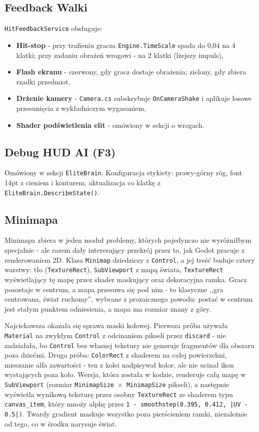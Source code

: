 \subsection{Feedback Walki}

\texttt{HitFeedbackService} obsługuje:
\begin{itemize}
    \item \textbf{Hit-stop} - przy trafieniu gracza \texttt{Engine.TimeScale} spada do 0{,}04 na 4 klatki; przy zadaniu obrażeń wrogowi - na 2 klatki (lżejszy impuls),
    \item \textbf{Flash ekranu} - czerwony, gdy gracz dostaje obrażenia; zielony, gdy zbiera rzadki przedmiot,
    \item \textbf{Drżenie kamery} - \texttt{Camera.cs} subskrybuje \texttt{OnCameraShake} i aplikuje losowe przesunięcia z wykładniczym wygasaniem,
    \item \textbf{Shader podświetlenia elit} - omówiony w sekcji o wrogach.
\end{itemize}

\subsection{Debug HUD AI (F3)}

Omówiony w sekcji \texttt{EliteBrain}. Konfiguracja etykiety: prawy-górny róg, font 14pt z cieniem i konturem, aktualizacja co klatkę z \texttt{EliteBrain.\allowbreak DescribeState()}.

\subsection{Minimapa}

Minimapa zbiera w jeden moduł problemy, których pojedynczo nie wyróżniłbym specjalnie - ale razem dały interesujący przekrój przez to, jak Godot pracuje z renderowaniem 2D. Klasa \texttt{Minimap} dziedziczy z \texttt{Control}, a jej treść buduje cztery warstwy: tło (\texttt{TextureRect}), \texttt{SubViewport} z mapą świata, \texttt{TextureRect} wyświetlający tę mapę przez shader maskujący oraz dekoracyjna ramka. Gracz pozostaje w centrum, a mapa przesuwa się pod nim - to klasyczne ,,gra centrowana, świat ruchomy'', wybrane z prozaicznego powodu: postać w centrum jest stałym punktem odniesienia, a mapa ma rozmiar znany z góry.

Najciekawsza okazała się sprawa maski kołowej. Pierwsza próba używała \texttt{Material} na zwykłym \texttt{Control} z odcinaniem pikseli przez \texttt{discard} - nie zadziałała, bo \texttt{Control} bez własnej tekstury nie generuje fragmentów dla obszaru poza dziećmi. Druga próba: \texttt{ColorRect} z shaderem na całej powierzchni, mieszanie alfa zawartości - ten z kolei nadpisywał kolor, ale nie ucinał ikon wystających poza koło. Wersja, która została w kodzie, renderuje całą mapę w \texttt{SubViewport} (rozmiar \texttt{MinimapSize}~$\times$~\texttt{MinimapSize} pikseli), a następnie wyświetla wynikową teksturę przez osobny \texttt{TextureRect} ze shaderem typu \texttt{canvas\_item}, który mnoży alphę przez \texttt{1 - smoothstep(0.395, 0.412, |UV - 0.5|)}. Twardy gradient maskuje wszystko poza pierścieniem ramki, niezależnie od tego, co w środku narysuje świat.

